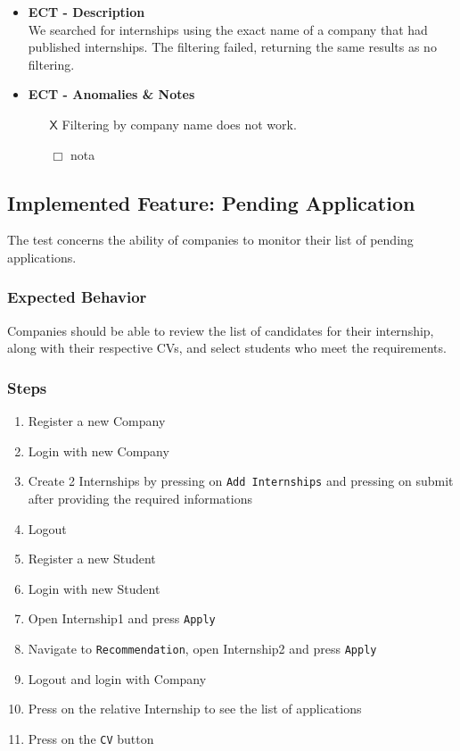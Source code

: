 \begin{itemize} [label= {\color{titleColor}\(\diamond\)}]
\begin{itemize}
        \item \textbf{\color{titleColor} ECT - Description}\\
        We searched for internships using the exact name of a company that had published internships. The filtering failed, returning the same results as no filtering.
        \item \textbf{\color{titleColor} ECT - Anomalies \& Notes}
        \begin{itemize}
            \item [{\color{titleColor}\(\mathsf{X}\)}]  Filtering by company name does not work.
            \item [{\color{titleColor}\(\Box \)}] nota
        \end{itemize} 
    \end{itemize}
\end{itemize}
\subsection{Implemented Feature:  Pending Application}
The test concerns the ability of companies to monitor their list of pending applications. 
\subsubsection{Expected Behavior}
Companies should be able to review the list of candidates for their internship, along with their respective CVs, and select students who meet the requirements.
\subsubsection{Steps}
\begin{enumerate}
    \item  Register a new Company 
    \item Login with new Company
    \item Create 2 Internships by pressing on \verb|Add Internships| and pressing on submit after providing the required informations
    \item Logout
    \item Register a new Student
    \item Login with new Student
    \item Open Internship1 and press \verb|Apply|
    \item Navigate to \verb|Recommendation|, open Internship2 and press \verb|Apply|
    \item Logout and login with Company 
    \item Press on the relative Internship to see the list of applications
    \item Press on the \verb|CV| button
\end{enumerate}
